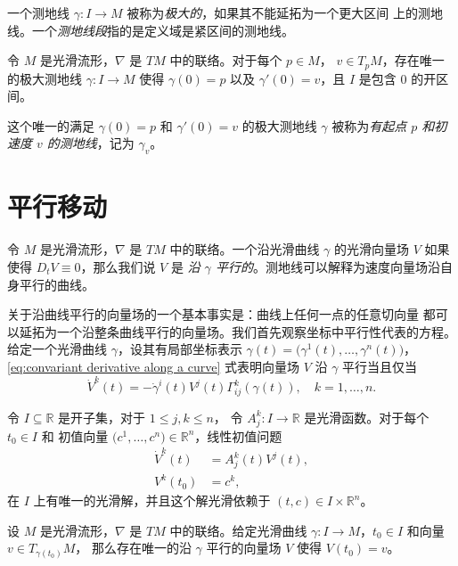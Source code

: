 \documentclass[fontset=none]{Notes}
\begin{document}
一个测地线 $\gamma:I\to M$ 被称为\emph{极大的}，如果其不能延拓为一个更大区间
上的测地线。一个\emph{测地线段}指的是定义域是紧区间的测地线。

\begin{corollary}
  令 $M$ 是光滑流形，$\nabla$ 是 $TM$ 中的联络。对于每个 $p\in M$，
  $v\in T_pM$，存在唯一的极大测地线 $\gamma:I\to M$ 使得
  $\gamma(0)=p$ 以及 $\gamma'(0)=v$，且 $I$ 是包含 $0$
  的开区间。
\end{corollary}

这个唯一的满足 $\gamma(0)=p$ 和 $\gamma'(0)=v$ 的极大测地线 $\gamma$
被称为\emph{有起点 $p$ 和初速度 $v$ 的测地线}，记为 $\gamma_v$。

\section{平行移动}

令 $M$ 是光滑流形，$\nabla$ 是 $TM$ 中的联络。一个沿光滑曲线 $\gamma$
的光滑向量场 $V$ 如果使得 $D_tV\equiv 0$，那么我们说 $V$ 是
\emph{沿 $\gamma$ 平行的}。测地线可以解释为速度向量场沿自身平行的曲线。

关于沿曲线平行的向量场的一个基本事实是：曲线上任何一点的任意切向量
都可以延拓为一个沿整条曲线平行的向量场。我们首先观察坐标中平行性代表的方程。
给定一个光滑曲线 $\gamma$，设其有局部坐标表示 
$\gamma(t)=\bigl(\gamma^1(t),\dots,\gamma^n(t)\bigr)$，
\eqref{eq:convariant derivative along a curve} 式表明向量场 $V$ 
沿 $\gamma$ 平行当且仅当
\begin{equation}
  \dot V^k(t)=-\dot\gamma^i(t)V^j(t)\Gamma_{ij}^k(\gamma(t)),
  \quad k=1,\dots,n.
\end{equation}

\begin{theorem}
  令 $I\subseteq \mathbb{R}$ 是开子集，对于 $1\leq j,k\leq n$，
  令 $A_j^k:I\to \mathbb{R}$ 是光滑函数。对于每个 $t_0\in I$ 和
  初值向量 $\bigl(c^1,\dots,c^n\bigr)\in \mathbb{R}^n$，线性初值问题
  \begin{equation}
    \begin{aligned}
      \dot V^k(t)&=A_j^k(t)V^j(t),\\
      V^k(t_0)&=c^k,
    \end{aligned}
  \end{equation}
  在 $I$ 上有唯一的光滑解，并且这个解光滑依赖于 $(t,c)\in I\times \mathbb{R}^n$。
\end{theorem}

\begin{theorem}[平行移动的存在性]\label{thm:existence of parallel transport}
  设 $M$ 是光滑流形，$\nabla$ 是 $TM$ 中的联络。给定光滑曲线
  $\gamma:I\to M$，$t_0\in I$ 和向量 $v\in T_{\gamma(t_0)}M$，
  那么存在唯一的沿 $\gamma$ 平行的向量场 $V$ 使得 $V(t_0)=v$。
\end{theorem}
\end{document}
